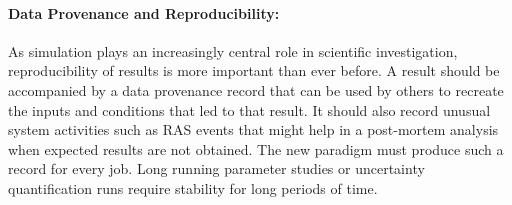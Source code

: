 \documentclass{article}
\newcommand{\ngrm}{NGRM}
\begin{document}
\paragraph{Data Provenance and Reproducibility:}
As simulation plays an increasingly central role in scientific
investigation, reproducibility of results is more important than ever
before. A result should be accompanied by a data provenance record that
can be used by others to recreate the inputs and conditions that led to
that result. It should also record unusual system activities 
such as RAS events that might help in a post-mortem analysis 
when expected results are not obtained.
The new paradigm must produce such a record for every job.
Long running parameter studies or uncertainty quantification runs
require stability for long periods of time. 
%


%
%
\end{document}

